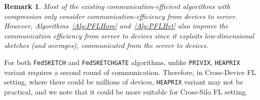 \documentclass[11pt]{article}
\newtheorem{remark}{Remark}
\newcommand\DrawBox[3][]{%
  \begin{tikzpicture}[remember picture,overlay]
    \draw[overlay,fill=gray!30,#1] 
    ([xshift=10em,yshift=-0.4ex]{pic cs:#2}) 
    rectangle 
    ([xshift=-4pt,yshift=1.1ex]pic cs:#3);
  \end{tikzpicture}%
}
\newcommand\DrawBoxx[3][]{%
  \begin{tikzpicture}[remember picture,overlay]
    \draw[overlay,fill=gray!30,#1] 
    ([xshift=-8.0em,yshift=-1.0ex]{pic cs:#2}) 
    rectangle 
    ([xshift=50pt,yshift=-1.2ex]pic cs:#3);
  \end{tikzpicture}%
}
\begin{document}
\begin{remark}\label{rmk:bidirect}
Most of the existing communication-efficient algorithms with compression only consider communication-efficiency from devices to server. However, Algorithms~\ref{Alg:PFLHom} and~\ref{Alg:PFLHet} also improve the communication efficiency from server to devices since it exploits low-dimensional sketches (and averages), communicated from the server to devices. 
\end{remark}
For both \texttt{FedSKETCH} and \texttt{FedSKETCHGATE} algorithms, unlike \texttt{PRIVIX}, \texttt{HEAPRIX} variant requires a second round of communication. 
Therefore, in Cross-Device FL setting, where there could be millions of devices, \texttt{HEAPRIX} variant may not be practical, and we note that it could be more suitable for Cross-Silo FL setting. 
\end{document}
